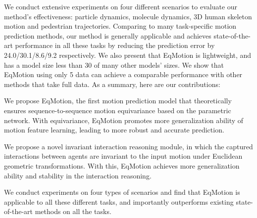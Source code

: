 \documentclass[10pt,twocolumn,letterpaper]{article}
\begin{document}
We conduct extensive experiments on four different scenarios to evaluate our method's effectiveness: particle dynamics, molecule dynamics, 3D human skeleton motion and pedestrian trajectories. Comparing to many task-specific motion prediction methods, our method is generally applicable and achieves state-of-the-art performance in all these tasks by reducing the prediction error by 24.0/30.1/8.6/9.2 respectively.
We also present that EqMotion is lightweight, and has a model size less than 30 of many other models' sizes. We show that EqMotion using only 5  data can achieve a comparable performance with other methods that take full data. As a summary, here are our contributions:



 We propose EqMotion, the first motion prediction model that theoretically ensures sequence-to-sequence motion equivariance based on the parametric network. With equivariance, EqMotion promotes more generalization ability of motion feature learning, leading to more robust and accurate prediction.


 We propose a novel invariant interaction reasoning module, in which the captured interactions between agents are invariant to the input motion under Euclidean geometric transformations. With this, EqMotion achieves more generalization ability and stability in the interaction reasoning.


 We conduct experiments on four types of scenarios and find that EqMotion is applicable to all these different 
tasks, and importantly outperforms existing state-of-the-art methods on all the tasks.


\label{sec:intro}
\end{document}
